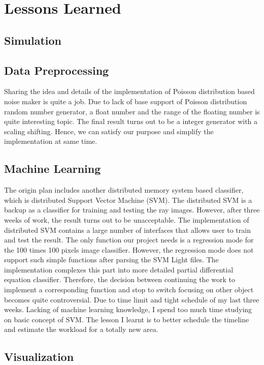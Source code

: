 \section{Lessons Learned}
\label{lessons}

\subsection{Simulation}


\subsection{Data Preprocessing}

Sharing the idea and details of the implementation of Poisson distribution based noise maker is quite a job. Due to lack of base support of Poisson distribution random number generator, a float number and the range of the floating number is quite interesting topic. The final result turns out to be a integer generator with a scaling shifting. Hence, we can satisfy our purpose and simplify the implementation at same time.



\subsection{Machine Learning}

The origin plan includes another distributed memory system based classifier, which is distributed Support Vector Machine (SVM). The distributed SVM is a backup as a classifier for training and testing the ray images. However, after three weeks of work, the result turns out to be unacceptable. The implementation of distributed SVM contains a large number of interfaces that allows user to train and test the result. The only function our project needs is a regression mode for the 100 times 100 pixels image classifier. However, the regression mode does not support such simple functions after parsing the SVM Light files. The implementation complexes this part into more detailed partial differential equation classifier. Therefore, the decision between continuing the work to implement a corresponding function and stop to switch focusing on other object becomes quite controversial. Due to time limit and tight schedule of my last three weeks. Lacking of machine learning knowledge, I spend too much time studying on basic concept of SVM. The lesson I learnt is to better schedule the timeline and estimate the workload for a totally new area.



\subsection{Visualization}